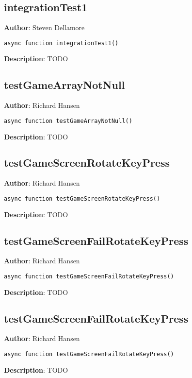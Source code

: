 \documentclass[12pt]{article}
\begin{document}
\subsection{integrationTest1}
\textbf{Author}: Steven Dellamore 
\vspace*{1\baselineskip}
\begin{lstlisting}
async function integrationTest1()
\end{lstlisting} 
\vspace*{1\baselineskip}
\textbf{Description}: TODO 



\subsection{testGameArrayNotNull}
\textbf{Author}: Richard Hansen 
\vspace*{1\baselineskip}
\begin{lstlisting}
async function testGameArrayNotNull()
\end{lstlisting} 
\vspace*{1\baselineskip}
\textbf{Description}: TODO 



\subsection{testGameScreenRotateKeyPress}
\textbf{Author}: Richard Hansen 
\vspace*{1\baselineskip}
\begin{lstlisting}
async function testGameScreenRotateKeyPress()
\end{lstlisting} 
\vspace*{1\baselineskip}
\textbf{Description}: TODO 



\subsection{testGameScreenFailRotateKeyPress}
\textbf{Author}: Richard Hansen 
\vspace*{1\baselineskip}
\begin{lstlisting}
async function testGameScreenFailRotateKeyPress()
\end{lstlisting} 
\vspace*{1\baselineskip}
\textbf{Description}: TODO 



\subsection{testGameScreenFailRotateKeyPress}
\textbf{Author}: Richard Hansen 
\vspace*{1\baselineskip}
\begin{lstlisting}
async function testGameScreenFailRotateKeyPress()
\end{lstlisting} 
\vspace*{1\baselineskip}
\textbf{Description}: TODO 
\end{document}
